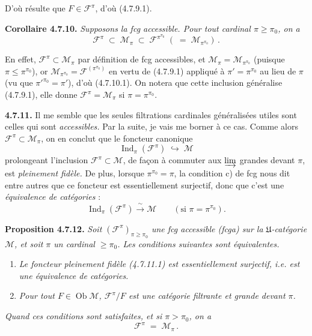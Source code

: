 \documentclass[11pt]{article}
\newcommand{\printedpage}[1]{\marginpar{\footnotesize p.~#1}}
\newcommand{\msp}[1]{\marginpar{\footnotesize [#1]}}
\newcommand{\Ob}{\operatorname{Ob}}
\newcommand{\Ind}{\operatorname{Ind}}
\begin{document}
D'où résulte que $F\in\mathcal{F}^{\pi}$, d'où (4.7.9.1).

\textbf{Corollaire 4.7.10.} \textit{Supposons la fcg accessible. Pour tout cardinal $\pi\geqslant\pi_0$, on a}
\[
\mathcal{F}^{\pi} \;\subset\; \mathcal{M}_\pi \;\subset\; \mathcal{F}^{\pi^{\pi_0}} \; ( \;=\; \mathcal{M}_{\pi^{\pi_0}}) \, . \tag*{(4.7.10.1)}
\]

En effet, $\mathcal{F}^{\pi}\subset\mathcal{M}_\pi$ par définition de fcg accessibles, et $\mathcal{M}_\pi=\mathcal{M}_{\pi^{\pi_0}}$ (puisque $\pi\leqslant\pi^{\pi_0}$), or $\mathcal{M}_{\pi^{\pi_0}}=\mathcal{F}^{(\pi^{\pi_0})}$ en vertu de (4.7.9.1) appliqué à $\pi'=\pi^{\pi_0}$ au lieu de $\pi$ (vu que $\pi'^{\pi_0}=\pi'$), d'où (4.7.10.1). On notera que cette inclusion généralise (4.7.9.1), elle donne $\mathcal{F}^{\pi}=\mathcal{M}_\pi$ si $\pi=\pi^{\pi_0}$.

\textbf{4.7.11.} Il me semble que les seules filtrations cardinales généralisées utiles sont celles qui sont \textit{accessibles.} Par la suite, je vais me borner à ce cas. Comme alors $\mathcal{F}^{\pi}\subset\mathcal{M}_\pi$, on en conclut
\msp{page 178}
que le foncteur canonique
\[
\Ind_\pi(\mathcal{F}^{\pi}) \;\hookrightarrow\; \mathcal{M} \tag*{(4.7.11.1)}
\]
prolongeant l'inclusion $\mathcal{F}^{\pi}\subset\mathcal{M}$, de façon à commuter aux $\varinjlim$ grandes devant $\pi$, est \textit{pleinement fidèle.} De plus, lorsque $\pi^{\pi_0}=\pi$, la condition c) de fcg nous dit entre autres que ce foncteur est essentiellement surjectif, donc que c'est une \textit{équivalence de catégories} :
\[
\Ind_\pi(\mathcal{F}^{\pi}) \xrightarrow{\ \sim\ } \mathcal{M} \qquad (\text{si } \pi=\pi^{\pi_0}). \tag*{(4.7.11.2)}
\]

\textbf{Proposition 4.7.12.} \textit{Soit $(\mathcal{F}^{\pi})_{\pi\geqslant\pi_0}$ une fcg accessible (fcga) sur la $\mathfrak{U}$-catégorie $\mathcal{M}$, et soit $\pi$ un cardinal $\geqslant\pi_0$. Les conditions suivantes sont équivalentes.}
\begin{enumerate}[label=\textit{\alph*)}]
\item \textit{Le foncteur pleinement fidèle (4.7.11.1) est essentiellement surjectif, i.e. est une équivalence de catégories.}
\item \textit{Pour tout $F\in\Ob\mathcal{M}$, $\mathcal{F}^{\pi}/F$ est une catégorie filtrante et grande devant $\pi$.}
\end{enumerate}

\noindent\printedpage{61}
\textit{Quand ces conditions sont satisfaites, et si $\pi>\pi_0$, on a}
\[
\mathcal{F}^{\pi} \;=\; \mathcal{M}_\pi \, . \tag*{(4.7.12.1)}
\]
\end{document}
